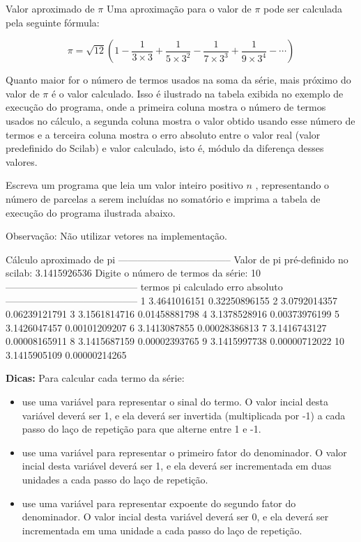 \documentclass[11pt,fleqn]{practice}
\begin{document}
\begin{task}[breakable]{Valor aproximado de $\pi$}{}
  Uma aproximação para o valor de $\pi$ pode ser calculada pela seguinte
  fórmula:

  \[ \pi = \sqrt{12} ( 1 - \frac{1}{3\times 3} + \frac{1}{5\times 3^2} - \frac{1}{7\times 3^3} + \frac{1}{9\times 3^4} - \cdots ) \]

  Quanto maior for o número de termos usados na soma da série, mais
  próximo do valor de $\pi$ é o valor calculado. Isso é ilustrado na
  tabela exibida no exemplo de execução do programa, onde a primeira
  coluna mostra o número de termos usados no cálculo, a segunda coluna
  mostra o valor obtido usando esse número de termos e a terceira coluna
  mostra o erro absoluto entre o valor real (valor predefinido do
  Scilab) e valor calculado, isto é, módulo da diferença desses valores.

  Escreva um programa que leia um valor inteiro positivo $n$ ,
  representando o número de parcelas a serem incluídas no
  somatório e imprima a tabela de execução do programa ilustrada abaixo.

  Observação: Não utilizar vetores na implementação.

  \begin{runexample}
Cálculo aproximado de pi
-----------------------------------
Valor de pi pré-definido no scilab: 3.1415926536
Digite o número de termos da série: 10
-----------------------------------------
termos  pi calculado  erro absoluto
-----------------------------------------
     1  3.4641016151  0.32250896155
     2  3.0792014357  0.06239121791
     3  3.1561814716  0.01458881798
     4  3.1378528916  0.00373976199
     5  3.1426047457  0.00101209207
     6  3.1413087855  0.00028386813
     7  3.1416743127  0.00008165911
     8  3.1415687159  0.00002393765
     9  3.1415997738  0.00000712022
    10  3.1415905109  0.00000214265
  \end{runexample}

  \textbf{Dicas:} Para calcular cada termo da série:
  \begin{itemize}
    \item use uma variável para representar o sinal do termo. O valor
    incial desta variável deverá ser 1, e ela deverá ser invertida
    (multiplicada por -1) a cada passo do laço de repetição para que
    alterne entre 1 e -1.
    \item use uma variável para representar o primeiro fator do
    denominador. O valor incial desta variável deverá ser 1, e ela
    deverá ser incrementada em duas unidades a cada passo do laço de
    repetição.
    \item use uma variável para representar expoente do segundo fator do
    denominador. O valor incial desta variável deverá ser 0, e ela
    deverá ser incrementada em uma unidade a cada passo do laço de
    repetição.
  \end{itemize}
  \tcblower
  \solution
\end{task}
\end{document}
